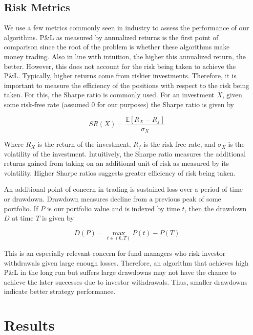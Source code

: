 \documentclass[12pt]{article}
\newcommand{\E}{\mathbb{E}}
\begin{document}
\subsection{Risk Metrics}

We use a few metrics commonly seen in industry to assess the performance of our algorithms. P\&L as measured by annualized returns is the first point of comparison since the root of the problem is whether these algorithms make money trading. Also in line with intuition, the higher this annualized return, the better. However, this does not account for the risk being taken to achieve the P\&L. Typically, higher returns come from riskier investments. Therefore, it is important to measure the efficiency of the positions with respect to the risk being taken. For this, the Sharpe ratio is commonly used. For an investment $X$, given some risk-free rate (assumed 0 for our purposes) the Sharpe ratio is given by

\begin{equation}
SR(X) = \frac{\E[R_X - R_f]}{\sigma_X}
\label{eq:sharpe}
\end{equation}

Where $R_X$ is the return of the investment, $R_f$ is the risk-free rate, and $\sigma_X$ is the volatility of the investment. Intuitively, the Sharpe ratio measures the additional returns gained from taking on an additional unit of risk as measured by its volatility. Higher Sharpe ratios suggests greater efficiency of risk being taken.

An additional point of concern in trading is sustained loss over a period of time or drawdown. Drawdown measures decline from a previous peak of some portfolio. If $P$ is our portfolio value and is indexed by time $t$, then the drawdown $D$ at time $T$ is given by

\begin{equation}
D(P) = \max_{t\in(0,T)}P(t) - P(T)
\label{eq:drawdown}
\end{equation}

This is an especially relevant concern for fund managers who risk investor withdrawals given large enough losses. Therefore, an algorithm that achieves high P\&L in the long run but suffers large drawdowns may not have the chance to achieve the later successes due to investor withdrawals. Thus, smaller drawdowns indicate better strategy performance.

\section{Results} \label{results}
\end{document}
